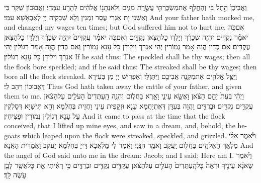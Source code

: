 {וַאֲבִיכֶן֙ הֵ֣תֶל בִּ֔י וְהֶחֱלִ֥ף אֶת\maqqaf מַשְׂכֻּרְתִּ֖י עֲשֶׂ֣רֶת מֹנִ֑ים וְלֹֽא\maqqaf נְתָנ֣וֹ אֱלֹהִ֔ים לְהָרַ֖ע עִמָּדִֽי׃}
{וַאֲבוּכוֹן שַׁקַּר בִּי וְאַשְׁנִי יָת אַגְרִי עֲסַר זִמְנִין וְלָא שַׁבְקֵיהּ יְיָ לְאַבְאָשָׁא עִמִּי׃}
{And your father hath mocked me, and changed my wages ten times; but God suffered him not to hurt me.}{}
{אִם\maqqaf כֹּ֣ה יֹאמַ֗ר נְקֻדִּים֙ יִהְיֶ֣ה שְׂכָרֶ֔ךָ וְיָלְד֥וּ כׇל\maqqaf הַצֹּ֖אן נְקֻדִּ֑ים וְאִם\maqqaf כֹּ֣ה יֹאמַ֗ר עֲקֻדִּים֙ יִהְיֶ֣ה שְׂכָרֶ֔ךָ וְיָלְד֥וּ כׇל\maqqaf הַצֹּ֖אן עֲקֻדִּֽים׃}
{אִם כְּדֵין הֲוָה אָמַר נְמוֹרִין יְהֵי אַגְרָךְ וִילִידָן כָּל עָנָא נְמוֹרִין וְאִם כְּדֵין הֲוָה אָמַר רְגוֹלִין יְהֵי אַגְרָךְ וִילִידָן כָּל עָנָא רְגוֹלִין׃}
{If he said thus: The speckled shall be thy wages; then all the flock bore speckled; and if he said thus: The streaked shall be thy wages; then bore all the flock streaked.}{}
{וַיַּצֵּ֧ל אֱלֹהִ֛ים אֶת\maqqaf מִקְנֵ֥ה אֲבִיכֶ֖ם וַיִּתֶּן\maqqaf לִֽי׃}
{וְאַפְרֵישׁ יְיָ מִן בְּעִירָא דַּאֲבוּכוֹן וִיהַב לִי׃}
{Thus God hath taken away the cattle of your father, and given them to me.}{}
{וַיְהִ֗י בְּעֵת֙ יַחֵ֣ם הַצֹּ֔אן וָאֶשָּׂ֥א עֵינַ֛י וָאֵ֖רֶא בַּחֲל֑וֹם וְהִנֵּ֤ה הָֽעַתֻּדִים֙ הָעֹלִ֣ים עַל\maqqaf הַצֹּ֔אן עֲקֻדִּ֥ים נְקֻדִּ֖ים וּבְרֻדִּֽים׃}
{וַהֲוָה בְּעִדָּן דְּאִתְיַחֲמָא עָנָא וּזְקַפִית עֵינַי וַחֲזֵית בְּחֶלְמָא וְהָא תֵּישַׁיָּא דְּסָלְקִין עַל עָנָא רְגוֹלִין נְמוֹרִין וּפַצִּיחִין׃}
{And it came to pass at the time that the flock conceived, that I lifted up mine eyes, and saw in a dream, and, behold, the he-goats which leaped upon the flock were streaked, speckled, and grizzled.}{}
{וַיֹּ֨אמֶר אֵלַ֜י מַלְאַ֧ךְ הָאֱלֹהִ֛ים בַּחֲל֖וֹם יַֽעֲקֹ֑ב וָאֹמַ֖ר הִנֵּֽנִי׃}
{וַאֲמַר לִי מַלְאֲכָא דַּייָ בְּחֶלְמָא יַעֲקֹב וַאֲמַרִית הָאֲנָא׃}
{And the angel of God said unto me in the dream: Jacob; and I said: Here am I.}{}
{וַיֹּ֗אמֶר שָׂא\maqqaf נָ֨א עֵינֶ֤יךָ וּרְאֵה֙ כׇּל\maqqaf הָֽעַתֻּדִים֙ הָעֹלִ֣ים עַל\maqqaf הַצֹּ֔אן עֲקֻדִּ֥ים נְקֻדִּ֖ים וּבְרֻדִּ֑ים כִּ֣י רָאִ֔יתִי אֵ֛ת כׇּל\maqqaf אֲשֶׁ֥ר לָבָ֖ן עֹ֥שֶׂה לָּֽךְ׃}
